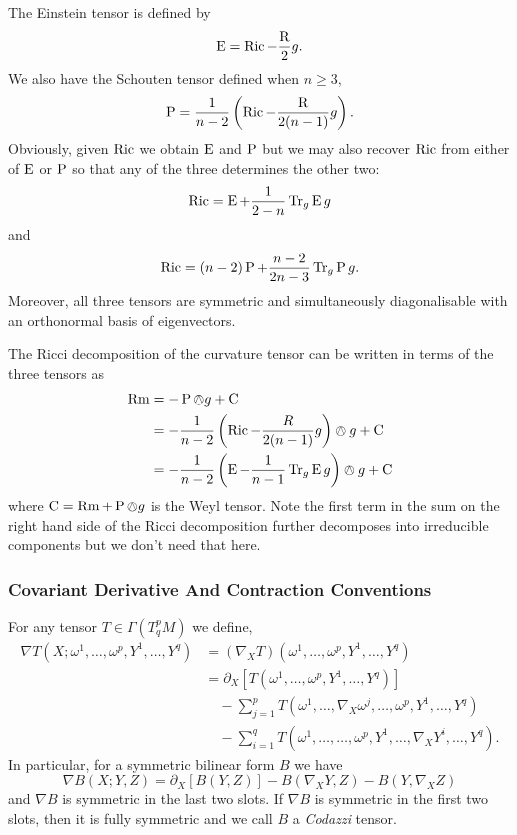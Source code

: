 \documentclass[a4paper, 12pt]{amsart}
\begin{document}
The Einstein tensor is defined by
\[
\operatorname{E} = \operatorname{Ric} - \frac{\operatorname{R}}{2} g.
\]
We also have the Schouten tensor defined when \(n \geq 3\),
\[
\operatorname{P} = \frac{1}{n-2} \left(\operatorname{Ric} - \frac{\operatorname{R}}{2(n-1)}g \right).
\]
Obviously, given \(\operatorname{Ric}\) we obtain \(\operatorname{E}\) and \(\operatorname{P}\) but we may also recover \(\operatorname{Ric}\) from either of \(\operatorname{E}\) or \(\operatorname{P}\) so that any of the three determines the other two:
\[
\operatorname{Ric} = \operatorname{E} + \frac{1}{2-n} \operatorname{Tr}_g \operatorname{E} g
\]
and
\[
\operatorname{Ric} = (n-2) \operatorname{P} + \frac{n-2}{2n-3} \operatorname{Tr}_g \operatorname{P} g.
\]
Moreover, all three tensors are symmetric and simultaneously diagonalisable with an orthonormal basis of eigenvectors.

The Ricci decomposition of the curvature tensor can be written in terms of the three tensors as
\begin{align*}
\operatorname{Rm} &= -\operatorname{P} \owedge g + \operatorname{C} \\
&= -\frac{1}{n-2} \left(\operatorname{Ric} - \frac{R}{2(n-1)} g\right) \owedge g + \operatorname{C} \\
&= -\frac{1}{n-2} \left(\operatorname{E}  -\frac{1}{n-1} \operatorname{Tr}_g \operatorname{E} g\right) \owedge g + \operatorname{C}
\end{align*}
where \(\operatorname{C} = \operatorname{Rm} + \operatorname{P} \owedge g\) is the Weyl tensor. Note the first term in the sum on the right hand side of the Ricci decomposition further decomposes into irreducible components but we don't need that here.

\subsubsection{Covariant Derivative And Contraction Conventions}
\label{subsubsec:notation_intrinsic_covariant}

For any tensor \(T \in \Gamma(T^p_q M)\) we define,
\[
\begin{split}
\nabla T (X; \omega^1, \dots, \omega^p, Y^1, \dots, Y^q) &= (\nabla _X T) (\omega^1, \dots, \omega^p, Y^1, \dots, Y^q) \\
&= \partial_X \left[T(\omega^1, \dots, \omega^p, Y^1, \dots, Y^q)\right] \\
&\quad - \sum_{j=1}^p T(\omega^1, \dots, \nabla_X \omega^j, \dots, \omega^p, Y^1, \dots, Y^q) \\
&\quad - \sum_{i=1}^q T(\omega^1, \dots, \dots, \omega^p, Y^1, \dots, \nabla_X Y^i, \dots, Y^q).
\end{split}
\]
In particular, for a symmetric bilinear form \(B\) we have
\[
\nabla B (X; Y, Z) = \partial_X [B(Y, Z)] - B(\nabla_X Y, Z) - B(Y, \nabla_X Z)
\]
and \(\nabla B\) is symmetric in the last two slots. If \(\nabla B\) is symmetric in the first two slots, then it is fully symmetric and we call \(B\) a \emph{Codazzi} tensor.
\end{document}

